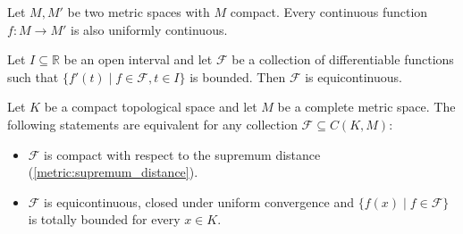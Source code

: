     \begin{theorem}
        Let $M,M'$ be two metric spaces with $M$ compact. Every continuous function $f:M\rightarrow M'$ is also uniformly continuous.
    \end{theorem}


    \begin{property}
        Let $I\subseteq\mathbb{R}$ be an open interval and let $\mathcal{F}$ be a collection of differentiable functions such that $\{f'(t)\mid f\in\mathcal{F},t\in I\}$ is bounded. Then $\mathcal{F}$ is equicontinuous.
    \end{property}

    \begin{theorem}
        Let $K$ be a compact topological space and let $M$ be a complete metric space. The following statements are equivalent for any collection $\mathcal{F}\subseteq C(K,M)$:
        \begin{itemize}
            \item $\mathcal{F}$ is compact with respect to the supremum distance (\cref{metric:supremum_distance}).
            \item $\mathcal{F}$ is equicontinuous, closed under uniform convergence and $\{f(x)\mid f\in\mathcal{F}\}$ is totally bounded for every $x\in K$.
        \end{itemize}
    \end{theorem}